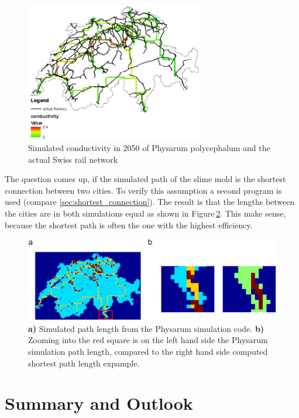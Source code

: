 \documentclass[11pt]{scrartcl}
\begin{document}
\begin{figure}[H]
	\centering
	\includegraphics[width=0.7\textwidth]{figures/conductivity_railway_2050}
	\caption{Simulated conductivity in 2050 of Physarum polycephalum and the actual Swiss rail network}
	\label{fig:conductivity_2050}
\end{figure}

The question comes up, if the simulated path of the slime mold is the shortest connection between two cities. To verify this assumption a second program is used (compare \ref{sec:shortest_connection}). The result is that the lengths between the cities are in both simulations equal as shown in Figure\,\ref{fig:short}. This make sense, because the shortest path is often the one with the highest efficiency.

\begin{figure}[H]
	\centering
	\includegraphics[width=12cm]{figures/figure3}
	\caption{\textbf{a)} Simulated path length from the Physarum simulation code. \textbf{b)} Zooming into the red square is on the left hand side the Physarum simulation path length, compared to the right hand side computed shortest path length expample.}
	\label{fig:short}
\end{figure}
\label{sec:matlab}


\section{Summary and Outlook}
\label{sec:summary}
\end{document}
